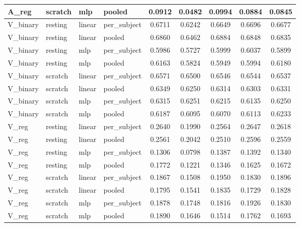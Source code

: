 \documentclass[10pt, a4paper, landscape]{article}
\begin{document}
\begin{longtable}{l l l l S[table-format=1.4] S[table-format=1.4] S[table-format=1.4] S[table-format=1.4] S[table-format=1.4] }
A\_reg & scratch & mlp & pooled & 0.0912 & 0.0482 & 0.0994 & 0.0884 & 0.0845\\
\midrule
V\_binary & resting & linear & per\_subject & 0.6711 & 0.6242 & 0.6649 & 0.6696 & 0.6677\\
V\_binary & resting & linear & pooled & 0.6860 & 0.6462 & 0.6884 & 0.6848 & 0.6835\\
V\_binary & resting & mlp & per\_subject & 0.5986 & 0.5727 & 0.5999 & 0.6037 & 0.5899\\
V\_binary & resting & mlp & pooled & 0.6163 & 0.5824 & 0.5949 & 0.5994 & 0.6180\\
V\_binary & scratch & linear & per\_subject & 0.6571 & 0.6500 & 0.6546 & 0.6544 & 0.6537\\
V\_binary & scratch & linear & pooled & 0.6349 & 0.6250 & 0.6314 & 0.6303 & 0.6331\\
V\_binary & scratch & mlp & per\_subject & 0.6315 & 0.6251 & 0.6215 & 0.6135 & 0.6250\\
V\_binary & scratch & mlp & pooled & 0.6187 & 0.6095 & 0.6070 & 0.6113 & 0.6233\\
\midrule
V\_reg & resting & linear & per\_subject & 0.2640 & 0.1990 & 0.2564 & 0.2647 & 0.2618\\
V\_reg & resting & linear & pooled & 0.2561 & 0.2042 & 0.2510 & 0.2596 & 0.2559\\
V\_reg & resting & mlp & per\_subject & 0.1306 & 0.0798 & 0.1387 & 0.1392 & 0.1340\\
V\_reg & resting & mlp & pooled & 0.1772 & 0.1221 & 0.1346 & 0.1625 & 0.1672\\
V\_reg & scratch & linear & per\_subject & 0.1867 & 0.1508 & 0.1950 & 0.1830 & 0.1896\\
V\_reg & scratch & linear & pooled & 0.1795 & 0.1541 & 0.1835 & 0.1729 & 0.1828\\
V\_reg & scratch & mlp & per\_subject & 0.1878 & 0.1748 & 0.1816 & 0.1926 & 0.1830\\
V\_reg & scratch & mlp & pooled & 0.1890 & 0.1646 & 0.1514 & 0.1762 & 0.1693\\
\end{longtable}
\normalsize
\end{document}
